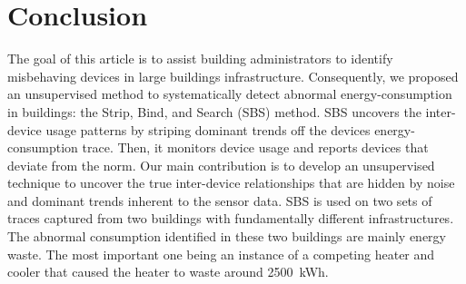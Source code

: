 \section{Conclusion}
The goal of this article is to assist building administrators to identify misbehaving devices in large buildings infrastructure.
Consequently, we proposed an unsupervised method to systematically detect abnormal energy-consumption in buildings: the Strip, Bind, and Search (SBS) method.
SBS uncovers the inter-device usage patterns by striping dominant trends off the devices energy-consumption trace.
Then, it monitors device usage and reports devices that deviate from the norm.  
Our main contribution is to develop an unsupervised technique to uncover the true inter-device relationships that are hidden by noise and 
dominant trends inherent to the sensor data.  
SBS is used on two sets of traces captured from two buildings with fundamentally different infrastructures.
The abnormal consumption identified in these two buildings are mainly energy waste.
The most important one being an instance of a competing heater and cooler that caused the heater to waste around 2500~kWh.




